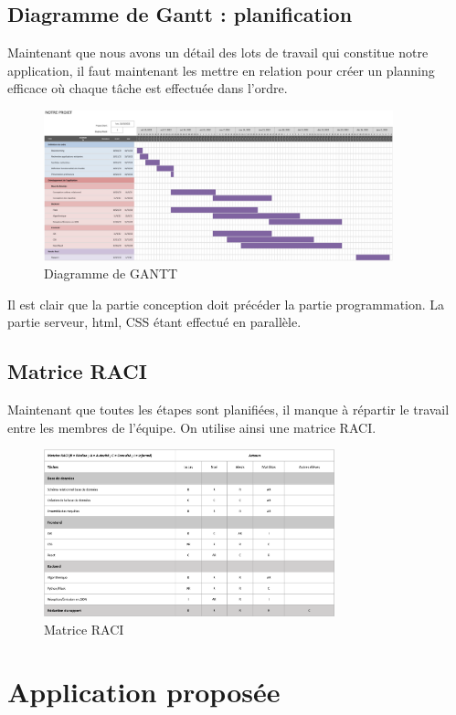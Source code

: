 \documentclass[french,a4paper]{article}
\begin{document}
\subsection{Diagramme de Gantt : planification}
Maintenant que nous avons un détail des lots de travail qui constitue notre application, il faut maintenant les mettre en relation pour créer un planning efficace où chaque tâche est effectuée dans l’ordre.
\begin{figure}[H]
    \centering
    \includegraphics[width=0.9\textwidth]{img/gantt.jpeg}
    \caption{Diagramme de GANTT}
\end{figure} 
Il est clair que la partie conception doit précéder la partie programmation. La partie serveur, html, CSS étant effectué en parallèle.

\subsection{Matrice RACI}
Maintenant que toutes les étapes sont planifiées, il manque à répartir le travail entre les membres de l’équipe. On utilise ainsi une matrice RACI.
\begin{figure}[H]
    \centering
    \includegraphics[width=0.75\textwidth]{img/RACI.png}
    \caption{Matrice RACI}
\end{figure} 

\newpage
\section{Application proposée}
\end{document}
